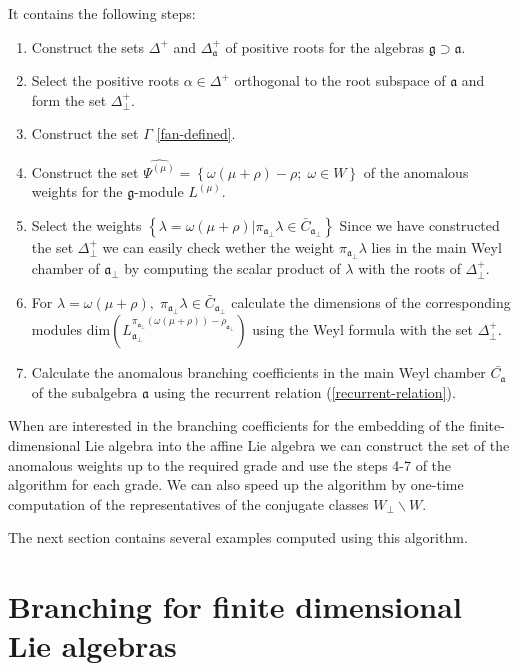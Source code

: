 \documentclass[a4paper,12pt]{article}
\theoremstyle{definition} \newtheorem{Def}{Definition}
\begin{document}
It contains the following steps:
\begin{enumerate}
\item Construct the sets $\Delta^{+}$ and $\Delta_{\mathfrak{a}}^{+}$ of positive roots for the algebras $\mathfrak{g} \supset \mathfrak{a}$.
\item Select the positive roots $\alpha\in \Delta^{+}$ orthogonal to the root subspace of $\mathfrak{a}$ and form the set $\Delta^{+}_{\bot}$.
\item Construct the set $\Gamma$ \eqref{fan-defined}.
\item Construct the set $\widehat{\Psi^{(\mu)}}=\left\{\omega(\mu+\rho)-\rho;\; \omega\in W\right\}$ of the anomalous weights for the $\mathfrak{g}$-module $L^{(\mu)}$.
\item Select the weights $\left\{ \lambda=\omega(\mu+\rho) | \pi_{\mathfrak{a}_{\bot}}\lambda \in \bar{C}_{\mathfrak{a}_{\bot}} \right\}$ Since we have constructed the set $\Delta^{+}_{\bot}$ we can easily check wether the weight $\pi_{\mathfrak{a}_{\bot}}\lambda$ lies in the main Weyl chamber of $\mathfrak{a}_{\bot}$ by computing the scalar product of $\lambda$ with the roots of $\Delta^{+}_{\bot}$.
\item For $\lambda=\omega(\mu+\rho),\; \pi_{\mathfrak{a}_{\bot}}\lambda\in \bar{C}_{\mathfrak{a}_{\bot}}$ calculate the dimensions of the corresponding modules $\mathrm{dim}\left(L^{\pi_{\mathfrak{a}_{\bot}}(\omega(\mu+\rho))-\rho_{\mathfrak{a}_{\bot}}}_{\mathfrak{a}_{\bot}}\right)$ using the Weyl formula with the set $\Delta^{+}_{\bot}$.
\item Calculate the anomalous branching coefficients in the main Weyl
  chamber $\bar{C_{\mathfrak{a}}}$ of the subalgebra $\mathfrak{a}$ using the recurrent relation (\ref{recurrent-relation}).
\end{enumerate}

When are interested in the branching coefficients for the embedding of the finite-dimensional Lie algebra into the affine Lie algebra we can construct the set of the anomalous weights up to the required grade and use the steps 4-7 of the algorithm for each grade. We can also speed up the algorithm by one-time computation of the representatives of the conjugate classes $W_{\bot}\backslash W$.

The next section contains several examples computed using this algorithm.

\section{Branching for finite dimensional Lie algebras}
\label{sec:finite-dimens-lie}
\end{document}
